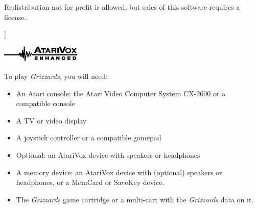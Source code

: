 \documentclass[9pt,twocolumn,openany,article]{memoir}
\newenvironment{ritemize}{\begin{itemize}\raggedright}{\end{itemize}}
\newcommand\picaskip{\vspace{12pt}}
\begin{document}
Redistribution not for profit is allowed, but sales of this software
requires a license.

\fi

\picaskip]

\includegraphics[width=1.5in]{../Manual/AtariVoxEnhanced.eps}

\let\cleardoublepage\clearpage

\mainmatter

\tableofcontents


\noindent{}To play \textit{Grizzards}, you will need:

\picaskip

\begin{ritemize}
\item  An Atari  console: the  Atari  Video Computer  System CX-2600  or
  a compatible console
\item A TV or video display
\item A joystick controller or a compatible gamepad
  \ifdefined\ATARIAGESAVE
  \item Optional: an AtariVox device with speakers or headphones
  \else
  \ifdefined\NOSAVE\else
\item A  memory device: an  AtariVox device with (optional)  speakers or
  headphones, or a MemCard or SaveKey device.
  \fi\fi
\item The \textit{Grizzards} game cartridge \ifdefined\ATARIAGESAVE\else
  or a multi-cart with the \textit{Grizzards} data on it. \fi
\end{ritemize}
\end{document}
